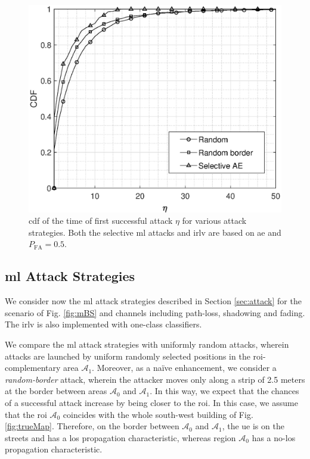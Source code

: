 \documentclass[draftcls,onecolumn,12pt]{IEEEtran}
\begin{document}
\begin{figure}[t]
    \centering
    \includegraphics[width=0.6\columnwidth]{res_selective_AE.eps}
    \caption{\ac{cdf} of the time of first successful attack $\eta$ for various attack strategies. Both the selective \ac{ml} attacks  and \ac{irlv} are based on \ac{ae} and $P_{\text{FA}}= 0.5$.}
    \label{fig:selectiveAE}
\end{figure}



\subsection{\ac{ml} Attack Strategies}

We consider now the \ac{ml} attack strategies described in Section \ref{sec:attack} for the scenario of Fig. \ref{fig:mBS} and channels including path-loss, shadowing and fading. The \ac{irlv} is also implemented with one-class classifiers. 


We compare the \ac{ml} attack strategies with uniformly random attacks, wherein attacks are launched by uniform randomly selected positions in the \ac{roi}-complementary area $\mathcal{A}_1$.  Moreover, as a na\"ive enhancement, we consider a \emph{random-border} attack, wherein the attacker moves only along a strip of 2.5 meters at the border between areas $\mathcal{A}_0$ and $\mathcal A_1$. In this way, we expect that the chances of a successful attack increase by being closer to the \ac{roi}. In this case, we assume that the \ac{roi} $\mathcal A_0$ coincides with the whole south-west building of Fig. \ref{fig:trueMap}. Therefore, on the border between $\mathcal A_0$ and $\mathcal A_1$, the \ac{ue} is on the streets and has a \ac{los} propagation characteristic, whereas region $\mathcal A_0$ has a no-\ac{los} propagation characteristic. 
\end{document}
